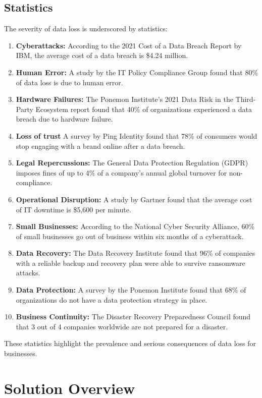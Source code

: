 \documentclass[12pt]{article}
\begin{document}
\subsection{Statistics}

The severity of data loss is underscored by statistics:

\begin{enumerate}
    \item \textbf{Cyberattacks:} According to the 2021 Cost of a Data Breach Report by IBM, the average cost of a data breach is \$4.24 million.
    \item \textbf{Human Error:} A study by the IT Policy Compliance Group found that 80\% of data loss is due to human error.
    \item \textbf{Hardware Failures:} The Ponemon Institute's 2021 Data Risk in the Third-Party Ecosystem report found that 40\% of organizations experienced a data breach due to hardware failure.
    \item \textbf{Loss of trust} A survey by Ping Identity found that 78\% of consumers would stop engaging with a brand online after a data breach.
    \item \textbf{Legal Repercussions:} The General Data Protection Regulation (GDPR) imposes fines of up to 4\% of a company's annual global turnover for non-compliance.
    \item \textbf{Operational Disruption:} A study by Gartner found that the average cost of IT downtime is \$5,600 per minute.
    \item \textbf{Small Businesses:} According to the National Cyber Security Alliance, 60\% of small businesses go out of business within six months of a cyberattack.
    \item \textbf{Data Recovery:} The Data Recovery Institute found that 96\% of companies with a reliable backup and recovery plan were able to survive ransomware attacks.
    \item \textbf{Data Protection:} A survey by the Ponemon Institute found that 68\% of organizations do not have a data protection strategy in place.
    \item \textbf{Business Continuity:} The Disaster Recovery Preparedness Council found that 3 out of 4 companies worldwide are not prepared for a disaster.
\end{enumerate}

These statistics highlight the prevalence and serious consequences of data loss for businesses.

\section{Solution Overview}
\end{document}
